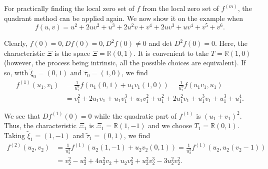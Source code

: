 For practically finding the local zero set of $f$ from the local zero set of $f^{(m)}$, the quadrant method can be applied again. We now show it on the example when
$$
f(u, v) = u^{2} + 2uv^{2} + u^{3} + 2u^{2} v + v^{4} + 2uv^{3} + uv^{4} + v^{5} + v^{6}.
$$

Clearly, $f(0) = 0, Df(0) = 0, D^{2}f(0) \neq 0$ and det $D^{2}f(0) = 0$. Here, the characteristic $\Xi$ is the space $\Xi = \mathbb{R} (0, 1)$. It is convenient to take $T = \mathbb{R}(1, 0)$ (however, the process being intrinsic, all the possible choices are equivalent). If so, with $\widetilde{\xi}_{0} = (0, 1)$ and $\widetilde{\tau}_{0} = (1, 0)$, we find
\begin{align*}
f^{(1)} (u_{1}, v_{1}) & = \frac{1}{u_{1}^{2}} f(u_{1}(0, 1) + u_{1}v_{1}(1, 0)) = \frac{1}{u_{1}^{2}} f(u_{1}v_{1}, u_{1}) = \\
& = v_{1}^{2} + 2u_{1}v_{1} + u_{1}v_{1}^{3} + u_{1}v_{1}^{2} + u_{1}^{2} + 2u_{1}^{2}v_{1} + u_{1}^{3}v_{1} + u_{1}^{3} + u_{1}^{4}.
\end{align*}

We see that $Df^{(1)}(0) = 0$ while the quadratic part of $f^{(1)}$ is $(u_{1} + v_{1})^{2}$. Thus, the characteristic $\Xi_{1}$ is $\Xi_{1} = \mathbb{R}(1, -1)$ and we choose $T_{1} = \mathbb{R}(0, 1)$. Taking $\widetilde{\xi}_{1} = (1, -1)$ and $\widetilde{\tau}_{1} = (0, 1)$, we find 
\begin{align*}
f^{(2)}(u_{2}, v_{2}) & = \frac{1}{u_{2}^{2}} f^{(1)}(u_{2}(1, -1) + u_{2}v_{2}(0, 1)) = \frac{1}{u_{2}^{2}} f^{(1)} (u_{2}, u_{2} (v_{2} - 1))\\
& = v_{2}^{2} - u_{2}^{2} + 4u_{2}^{2}v_{2} + u_{2}v_{2}^{2} + u_{2}^{2}v_{2}^{3} - 3u_{2}^{2}v_{2}^{2}.
\end{align*}

